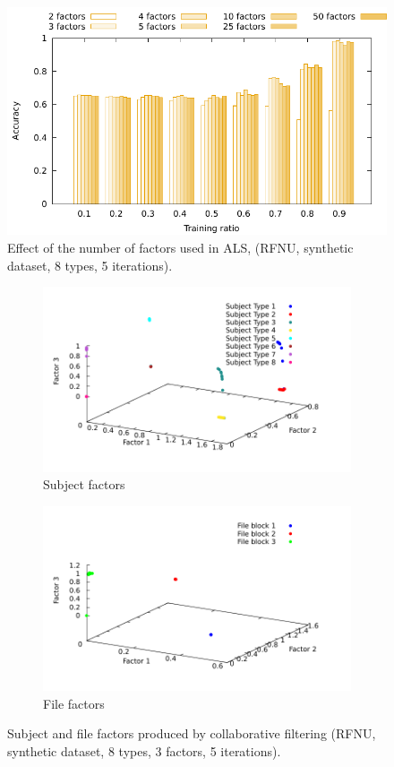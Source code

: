 \documentclass[10pt, conference, compsocconf]{IEEEtran}
\begin{document}
\begin{figure}
\centering
\includegraphics[width=0.6\columnwidth]{data/results/means_of_results/ALS/Synthetic/8type-RFNU-Differ-Num-Factors/ALS-8-types-ranks.pdf}
\caption{Effect of the number of factors used in ALS, (RFNU, synthetic dataset, 8 types, 5 iterations).}
\label{fig:factors}
\end{figure}
\begin{figure}
\begin{subfigure}{0.5\columnwidth}
\includegraphics[width=\columnwidth]{./data/results/latent-factors/5i-3f-ALS-r1-08-userFactors.pdf}
\caption{Subject factors}
\end{subfigure}\hfill
\begin{subfigure}{0.5\columnwidth}
\includegraphics[width=\columnwidth]{./data/results/latent-factors/5i-3f-ALS-r1-08-itemFactors.pdf}
\caption{File factors}
\end{subfigure}
\caption{Subject and file factors produced by collaborative filtering (RFNU, synthetic dataset, 8 types, 3 factors, 5 iterations).}
\label{fig:factors3d}
\end{figure}
\end{document}
